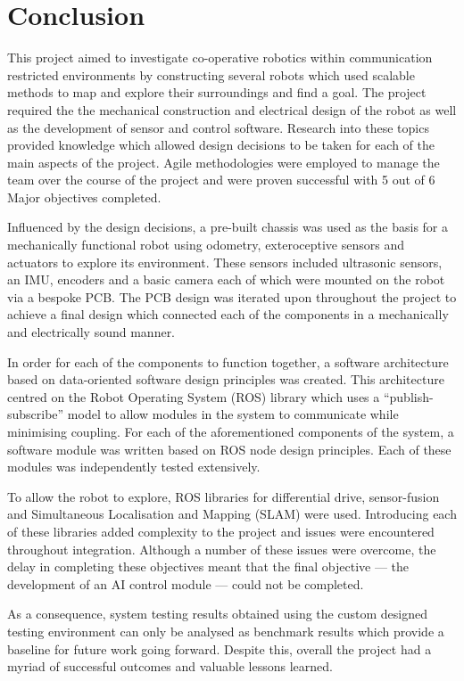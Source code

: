 
\chapter{Conclusion}\label{conclusion}
This project aimed to investigate co-operative robotics within 
communication restricted environments by constructing several robots 
which used scalable methods to map and explore their surroundings and find 
a goal. The project required the the mechanical construction and 
electrical design of the robot as well as the development of sensor and 
control software.  Research into these topics provided knowledge which 
allowed 
design decisions to be taken for each of the main aspects of the project. 
Agile methodologies were employed to manage the team over the course of 
the project and were proven successful with 5 out of 6 Major objectives 
completed. 

Influenced by the design decisions, a pre-built chassis was 
used as the basis for a mechanically functional robot using odometry, 
exteroceptive sensors and actuators to explore its environment. These sensors included ultrasonic sensors, an IMU, encoders and a basic 
camera each of which were mounted on the robot via a bespoke PCB. The PCB 
design was iterated upon throughout the project to achieve a final design 
which connected each of the components in a mechanically and 
electrically sound manner. 

In order for each of the components to function together, a software 
architecture based on data-oriented software design principles was 
created. This architecture centred on the Robot Operating System (ROS) 
library which uses a ``publish-subscribe'' model to allow modules in the 
system to communicate while minimising coupling. For each of the aforementioned components of the 
system, a software module was written based on ROS node design principles. 
Each of these modules was independently tested extensively. 

To allow the robot to explore, ROS libraries for differential drive, 
sensor-fusion and Simultaneous Localisation and Mapping (SLAM) were used. 
Introducing each of these libraries added complexity to the project and 
issues were encountered throughout integration. Although a number of these 
issues were overcome, the delay in completing these objectives meant that 
the final objective --- the development of an AI control module --- could not 
be completed. 

As a consequence, system testing results obtained using the custom designed testing environment can only be analysed as 
benchmark results which provide a baseline for future work going forward. 
Despite this, overall the project had a myriad of successful outcomes and 
valuable lessons learned.      
